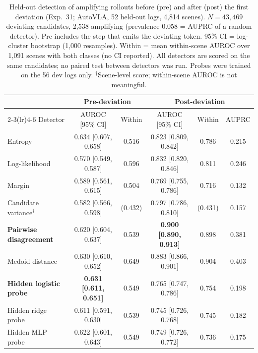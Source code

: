 \begin{table}[t]
\centering
\small
\setlength{\tabcolsep}{4pt}
\caption{Held-out detection of amplifying rollouts before (pre) and after (post) the first deviation (Exp.~31; AutoVLA, 52 held-out logs, 4{,}814 scenes). $N=43{,}469$ deviating candidates, 2{,}538 amplifying (prevalence 0.058 = AUPRC of a random detector). Pre includes the step that emits the deviating token. 95\% CI = log-cluster bootstrap (1{,}000 resamples). Within = mean within-scene AUROC over 1{,}091 scenes with both classes (no CI reported). All detectors are scored on the same candidates; no paired test between detectors was run. Probes were trained on the 56 dev logs only. $^\dagger$Scene-level score; within-scene AUROC is not meaningful.}
\label{tab:detection_main}
\begin{tabular}{lccccc}
\toprule
 & \multicolumn{2}{c}{Pre-deviation} & \multicolumn{3}{c}{Post-deviation} \\
\cmidrule(lr){2-3}\cmidrule(lr){4-6}
Detector & AUROC [95\% CI] & Within & AUROC [95\% CI] & Within & AUPRC \\
\midrule
Entropy & 0.634 [0.607, 0.658] & 0.516 & 0.823 [0.809, 0.842] & 0.786 & 0.215 \\
Log-likelihood & 0.570 [0.549, 0.587] & 0.596 & 0.832 [0.820, 0.846] & 0.811 & 0.246 \\
Margin & 0.589 [0.561, 0.615] & 0.504 & 0.769 [0.755, 0.786] & 0.716 & 0.132 \\
Candidate variance$^\dagger$ & 0.582 [0.566, 0.598] & (0.432) & 0.797 [0.786, 0.810] & (0.431) & 0.157 \\
\textbf{Pairwise disagreement} & 0.620 [0.604, 0.637] & 0.539 & \textbf{0.900 [0.890, 0.913]} & 0.898 & 0.381 \\
Medoid distance & 0.630 [0.610, 0.652] & 0.649 & 0.883 [0.866, 0.901] & 0.904 & 0.403 \\
\midrule
\textbf{Hidden logistic probe} & \textbf{0.631 [0.611, 0.651]} & 0.549 & 0.765 [0.747, 0.786] & 0.754 & 0.198 \\
Hidden ridge probe & 0.611 [0.591, 0.630] & 0.539 & 0.745 [0.726, 0.768] & 0.745 & 0.182 \\
Hidden MLP probe & 0.622 [0.601, 0.643] & 0.549 & 0.749 [0.726, 0.772] & 0.736 & 0.175 \\
\bottomrule
\end{tabular}
\end{table}

